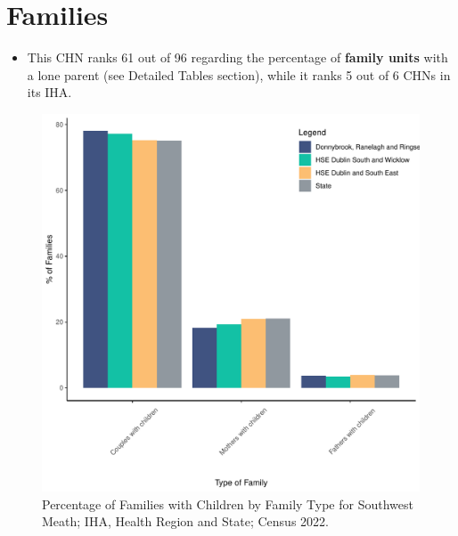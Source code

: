 \documentclass{article}
\begin{document}
\section{Families}\label{sect:Fam}
\begin{itemize}
\item This CHN ranks  61 out of 96 regarding the percentage of \textbf{family units} with a lone parent (see Detailed Tables section), while it ranks   5 out of 6 CHNs in its IHA.
\end{itemize}
\begin{figure}[H]
	\centering
	\includegraphics[width = 150mm]{../figures/FamED.pdf}
	\caption{Percentage of Families with Children by Family Type for Southwest Meath; IHA, Health Region and State; Census 2022.}
	\label{fig:vbnv}
	\end{figure}
	
\end{document}
